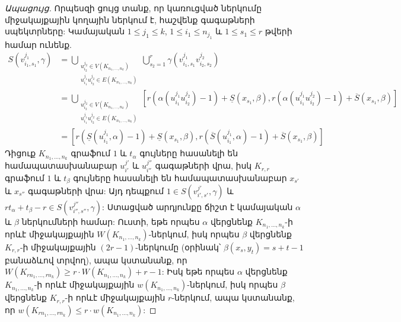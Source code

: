 \begin{hide}
\begin{proof}[Ապացույց]
Որպեսզի ցույց տանք, որ կառուցված ներկումը միջակայքային կողային ներկում է, հաշվենք գագաթների սպեկտրները: Կամայական $1 \leq j_1 \leq k$, $1\leq i_1 \leq n_{j_1}$ և $1\leq s_1 \leq r$ թվերի համար ունենք.
\begin{align*}
    S\left(v_{i_1,s_1}^{j_1}, \gamma\right) &= \bigcup\limits_{\substack{u_{i_2}^{j_2} \in V(K_{n_1, \ldots, n_k})\\ u_{i_1}^{j_1}u_{i_2}^{j_2} \in E(K_{n_1, \ldots, n_k})}}{
        \bigcup\limits_{s_2=1}^{r}{
            \gamma\left(v_{i_1,s_1}^{j_1}v_{i_2,s_2}^{j_2}\right)
        }
    }\\
    &= \bigcup\limits_{\substack{u_{i_2}^{j_2} \in V(K_{n_1, \ldots, n_k})\\ u_{i_1}^{j_1}u_{i_2}^{j_2} \in E(K_{n_1, \ldots, n_k})}}{
        \left[r(\alpha(u_{i_1}^{j_1}u_{i_2}^{j_2})-1) + \underline{S}(x_{s_1}, \beta), r(\alpha(u_{i_1}^{j_1}u_{i_2}^{j_2})-1) + \overline{S}(x_{s_1}, \beta) \right]
    }\\
    &= \left[r(\underline{S}(u_{i_1}^{j_1}, \alpha)-1) + \underline{S}(x_{s_1}, \beta), r(\overline{S}(u_{i_1}^{j_1},\alpha)-1) + \overline{S}(x_{s_1}, \beta) \right]
\end{align*}
Դիցուք $K_{n_1, \ldots, n_k}$ գրաֆում $1$ և $t_{\alpha}$ գույները հասանելի են համապատասխանաբար $u_{i'}^{j'}$ և $u_{i''}^{j''}$ գագաթների վրա, իսկ $K_{r,r}$ գրաֆում $1$ և $t_{\beta}$ գույները հասանելի են համապատասխանաբար $x_{s'}$ և $x_{s''}$ գագաթների վրա: Այդ դեպքում $1 \in S\left(v_{i',s'}^{j'}, \gamma\right)$ և $rt_{\alpha}+t_{\beta}-r \in S\left(v_{i'',s''}^{j''}, \gamma\right)$: Ստացված արդյունքը ճիշտ է կամայական $\alpha$ և $\beta$ ներկումների համար: Ուստի, եթե որպես $\alpha$ վերցնենք $K_{n_1, \ldots, n_k}$-ի որևէ միջակայքային $W(K_{n_1, \ldots, n_k})$-ներկում, իսկ որպես $\beta$ վերցնենք $K_{r,r}$-ի միջակայքային $(2r-1)$-ներկումը (օրինակ՝ $\beta(x_s,y_t)=s+t-1$ բանաձևով տրվող), ապա կստանանք, որ $W(K_{rn_1, \ldots, rn_k}) \geq r\cdot W(K_{n_1, \ldots, n_k}) + r-1$: Իսկ եթե որպես $\alpha$ վերցնենք $K_{n_1, \ldots, n_k}$-ի որևէ միջակայքային $w(K_{n_1, \ldots, n_k})$-ներկում, իսկ որպես $\beta$ վերցնենք $K_{r,r}$-ի որևէ միջակայքային $r$-ներկում, ապա կստանանք, որ $w(K_{rn_1, \ldots, rn_k}) \leq r\cdot w(K_{n_1, \ldots, n_k})$:

\end{proof}
\begin{figure}
\centering
{}
\end{figure}
\end{hide}
